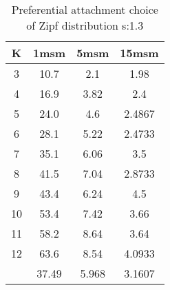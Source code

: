 \begin{table}[H]
\centering
\begin{tabular}{c|ccc}
K &1msm &5msm &15msm\\
\hline
3 & 10.7 & 2.1 & 1.98\\
4 & 16.9 & 3.82 & 2.4\\
5 & 24.0 & 4.6 & 2.4867\\
6 & 28.1 & 5.22 & 2.4733\\
7 & 35.1 & 6.06 & 3.5\\
8 & 41.5 & 7.04 & 2.8733\\
9 & 43.4 & 6.24 & 4.5\\
10 & 53.4 & 7.42 & 3.66\\
11 & 58.2 & 8.64 & 3.64\\
12 & 63.6 & 8.54 & 4.0933\\
\hline
& 37.49 & 5.968 & 3.1607\\
\end{tabular}
\caption{Preferential attachment choice of Zipf distribution s:1.3}
\label{tab:s1.3}
\end{table}
